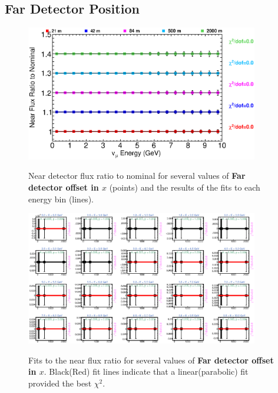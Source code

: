 \clearpage
\subsection{Far Detector Position}

\begin{figure}[ht]
  \begin{center}
    {\includegraphics[width=4.0in]{figures/LBNEFDX_near_summary.eps}}
  \end{center}
\caption{ Near detector flux ratio to nominal for several values of {\bf Far detector offset in $x$} (points) and the results of the fits to each energy bin (lines).}
\end{figure}

\begin{figure}[hb]
  \begin{center}
    {\includegraphics[width=4.0in]{figures/LBNEFDX_near_fits.eps}}
  \end{center}
\caption{ Fits to the near flux ratio for several values of {\bf Far detector offset in $x$}. Black(Red) fit lines indicate that a linear(parabolic) fit provided the best $\chi^2$. }
\end{figure}

